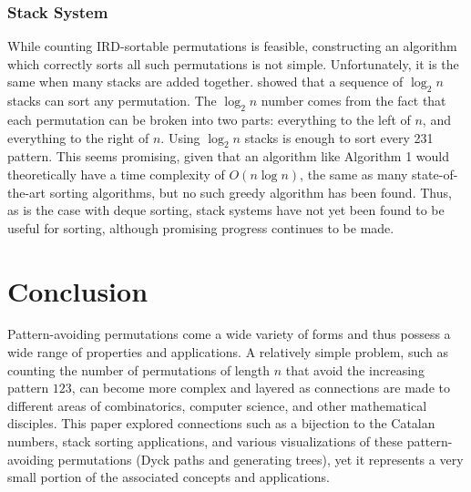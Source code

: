 \documentclass[12pt]{article}
\begin{document}
\subsubsection{Stack System}
While counting IRD-sortable permutations is feasible, constructing an algorithm which correctly sorts all such permutations is not simple. Unfortunately, it is the same when many stacks are added together. \cite{knuth} showed that a sequence of $\log_2n$ stacks can sort any permutation. The $\log_2n$ number comes from the fact that each permutation can be broken into two parts: everything to the left of $n$, and everything to the right of $n$. Using $\log_2n$ stacks is enough to sort every 231 pattern. This seems promising, given that an algorithm like Algorithm 1 would theoretically have a time complexity of $O(n\log n)$, the same as many state-of-the-art sorting algorithms, but no such greedy algorithm has been found. Thus, as is the case with deque sorting, stack systems have not yet been found to be useful for sorting, although promising progress continues to be made.


\section{Conclusion}

Pattern-avoiding permutations come a wide variety of forms and thus possess a wide range of properties and applications. A relatively simple problem, such as counting the number of permutations of length $n$ that avoid the increasing pattern $123$, can become more complex and layered as connections are made to different areas of combinatorics, computer science, and other mathematical disciples. This paper explored connections such as a bijection to the Catalan numbers, stack sorting applications, and various visualizations of these pattern-avoiding permutations (Dyck paths and generating trees), yet it represents a very small portion of the associated concepts and applications. 



\printindex



\end{document}
